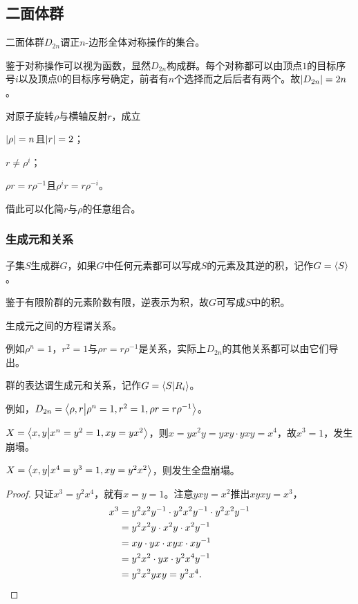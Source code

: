 \documentclass{ctexrep}
\begin{document}
\subsection{二面体群}
\begin{definition}
二面体群$D_{2n}$谓正$n$-边形全体对称操作的集合。
\end{definition}
鉴于对称操作可以视为函数，显然$D_{2n}$构成群。每个对称都可以由顶点$1$的目标序号$i$以及顶点$0$的目标序号确定，前者有$n$个选择而之后后者有两个。故$\abs{D_{2n}} = 2n$。
\begin{proposition}
对原子旋转$\rho$与横轴反射$r$，成立
\begin{cenum}
\item $\abs{\rho}=n$且$\abs{r}=2$；
\item $r\neq \rho^i$；
\item $\rho r=r\rho^{-1}$且$\rho^i r = r\rho^{-i}$。
\end{cenum}
\end{proposition}
借此可以化简$r$与$\rho$的任意组合。
\subsubsection{生成元和关系}
\begin{definition}
子集$S$生成群$G$，如果$G$中任何元素都可以写成$S$的元素及其逆的积，记作$G=\langle S\rangle$。
\end{definition}
鉴于有限阶群的元素阶数有限，逆表示为积，故$G$可写成$S$中的积。
\begin{definition}
生成元之间的方程谓关系。
\end{definition}
例如$\rho^n=1$，$r^2=1$与$\rho r = r \rho^{-1}$是关系，实际上$D_{2n}$的其他关系都可以由它们导出。
\begin{definition}
群的表达谓生成元和关系，记作$G=\braket{S}{R_i}$。
\end{definition}
例如，$D_{2n} = \braket{\rho, r}{\rho^n=1, r^2=1, \rho r = r \rho^{-1}}$。
\begin{ex}
$X=\braket{x,y}{x^n=y^2=1,xy = yx^2}$，则$x = yx^2y = yxy\cdot yxy = x^4$，故$x^3=1$，发生崩塌。
\end{ex}
\begin{ex}
$X=\braket{x,y}{x^4=y^3=1,xy = y^2x^2}$，则发生全盘崩塌。
\end{ex}
\begin{proof}
只证$x^3=y^2x^4$，就有$x=y=1$。注意$yxy=x^2$推出$xyxy=x^3$，
\begin{align*}
x^3 &= y^2x^2y^{-1}\cdot y^2x^2y^{-1} \cdot y^2x^2y^{-1}\\
&= y^2x^2y\cdot x^2y\cdot x^2y^{-1}\\
&= xy \cdot yx\cdot xyx\cdot xy^{-1}\\
&= y^2x^2\cdot yx\cdot y^2x^4y^{-1}\\
&=y^2x^2yxy = y^2x^4.\qedhere
\end{align*}
\end{proof}
\end{document}
